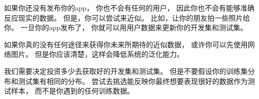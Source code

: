 \iffalse
If you have not yet launched your mobile app, you might not have any users yet, and thus
might not be able to get data that accurately reflects what you have to do well on in the
future. But you might still try to approximate this. For example, ask your friends to take
mobile phone pictures and send them to you. Once your app is launched, you can update
your dev/test sets using actual user data.
If you really don’t have any way of getting data that approximates what you expect to get in
the future, perhaps you can start by using website images. But you should be aware of the
risk of this leading to a system that doesn’t generalize well.
It requires judgment to decide how much to invest in developing great dev and test sets. But
don’t assume your training distribution is the same as your test distribution. Try to pick test
examples that reflect what you ultimately want to perform well on, rather than whatever data
you happen to have for training.
\fi

如果你还没有发布你的app，
你也不会有任何的用户，
因此你也不会有能够准确反应现实的数据。
但是，你可以尝试来近似。
比如，让你的朋友拍一些照片给你。
一旦你的app发布了，
你就可以用用户数据来更新你的开发集和测试集。

如果你真的没有任何途径来获得你未来所期待的近似数据，
或许你可以先使用网络图片。
但是你应该清楚，这样会降低系统的泛化能力。

我们需要决定投资多少去获取好的开发集和测试集。
但是不要假设你的训练集分布和测试集有相同的分布。
尝试去挑选能反映你最终想要表现很好的数据作为测试样本，
而不是你遇到的任何训练数据。

